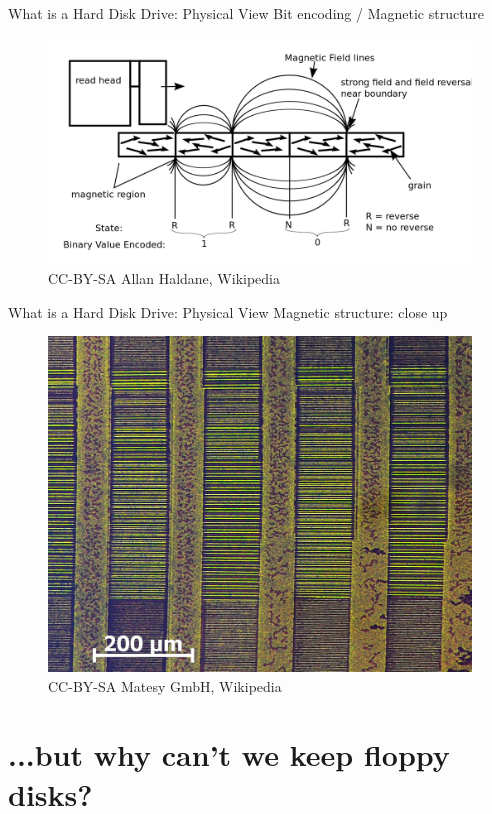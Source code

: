 \documentclass[12pt]{beamer}
\begin{document}
\begin{frame}[fragile]{What is a Hard Disk Drive: Physical View}
	Bit encoding / Magnetic structure
\begin{figure}[p]
	\centering
	\includegraphics[width=\linewidth]{img/magnetic_track.png}
	\caption{CC-BY-SA Allan Haldane, Wikipedia}
\end{figure}
\end{frame}


\begin{frame}[fragile]{What is a Hard Disk Drive: Physical View}
	Magnetic structure: close up
	\begin{figure}[p]
		\centering
		\includegraphics[width=0.7\linewidth]{img/floppy_physical.jpg}
		\caption{CC-BY-SA Matesy GmbH, Wikipedia}
	\end{figure}
\end{frame}

\section{...but why can't we keep floppy disks?}
\end{document}
